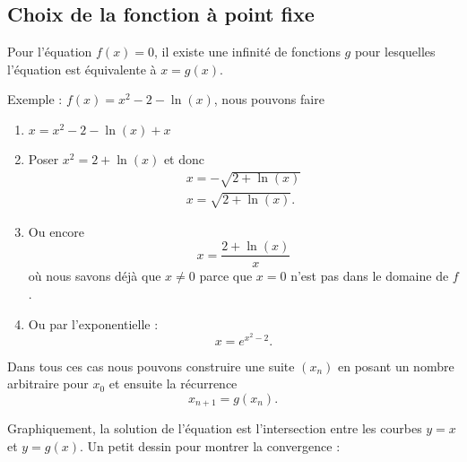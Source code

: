 \subsection{Choix de la fonction à point fixe}

Pour l'équation \( f(x)=0\), il existe une infinité de fonctions \( g\) pour lesquelles l'équation est équivalente à \( x=g(x)\).

Exemple : \( f(x)=x^2-2-\ln(x)\), nous pouvons faire
\begin{enumerate}
    \item
        \( x=x^2-2-\ln(x)+x\)
    \item
        Poser \( x^2=2+\ln(x)\) et donc
        \begin{subequations}
            \begin{align}
                x=-\sqrt{2+\ln(x)}\\
                x=\sqrt{2+\ln(x)}.
            \end{align}
        \end{subequations}
    \item
        Ou encore 
        \begin{equation}
            x=\frac{ 2+\ln(x) }{ x }
        \end{equation}
        où nous savons déjà que \( x\neq 0\) parce que \( x=0\) n'est pas dans le domaine de \( f\).
    \item
        Ou par l'exponentielle :
        \begin{equation}
            x= e^{x^2-2}.
        \end{equation}
\end{enumerate}
Dans tous ces cas nous pouvons construire une suite \( (x_n)\) en posant un nombre arbitraire pour \( x_0\) et ensuite la récurrence 
\begin{equation}
    x_{n+1}=g(x_n).
\end{equation}

Graphiquement, la solution de l'équation est l'intersection entre les courbes \( y=x\) et \( y=g(x)\). Un petit dessin pour montrer la convergence :

\begin{center}
   
\end{center}

